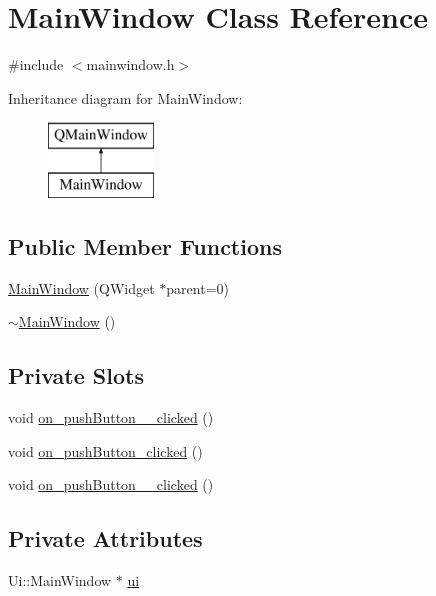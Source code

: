 \hypertarget{classMainWindow}{}\section{Main\+Window Class Reference}
\label{classMainWindow}


{\ttfamily \#include $<$mainwindow.\+h$>$}

Inheritance diagram for Main\+Window\+:\begin{figure}[H]
\begin{center}
\leavevmode
\includegraphics[height=2.000000cm]{classMainWindow}
\end{center}
\end{figure}
\subsection*{Public Member Functions}
\begin{DoxyCompactItemize}
\item 
\hyperlink{classMainWindow_a8b244be8b7b7db1b08de2a2acb9409db}{Main\+Window} (Q\+Widget $\ast$parent=0)
\item 
\hyperlink{classMainWindow_ae98d00a93bc118200eeef9f9bba1dba7}{$\sim$\+Main\+Window} ()
\end{DoxyCompactItemize}
\subsection*{Private Slots}
\begin{DoxyCompactItemize}
\item 
void \hyperlink{classMainWindow_ae907ba21cd47c6903e2744fd24cfeb78}{on\+\_\+push\+Button\+\_\+\_\+clicked} ()
\item 
void \hyperlink{classMainWindow_a4de79c63c7fa0b8d7c468ac71f20be81}{on\+\_\+push\+Button\+\_\+clicked} ()
\item 
void \hyperlink{classMainWindow_ae0e46dc3da4ee07bf66e73e20300220c}{on\+\_\+push\+Button\+\_\+\_\+clicked} ()
\end{DoxyCompactItemize}
\subsection*{Private Attributes}
\begin{DoxyCompactItemize}
\item 
Ui\+::\+Main\+Window $\ast$ \hyperlink{classMainWindow_a35466a70ed47252a0191168126a352a5}{ui}
\end{DoxyCompactItemize}


